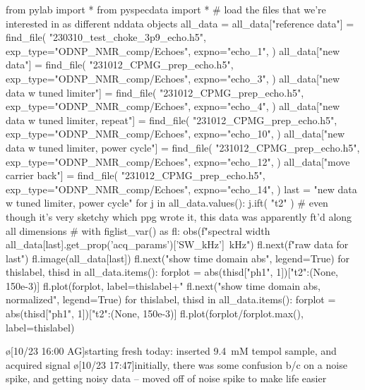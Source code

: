 \begin{python}[on]
from pylab import *
from pyspecdata import *
# {{{ load the files that we're interested in as different nddata objects
all_data = {}
all_data["reference data"] = find_file(
    "230310_test_choke_3p9_echo.h5",
    exp_type="ODNP_NMR_comp/Echoes",
    expno="echo_1",
)
all_data["new data"] = find_file(
    "231012_CPMG_prep_echo.h5",
    exp_type="ODNP_NMR_comp/Echoes",
    expno="echo_3",
)
all_data["new data w tuned limiter"] = find_file(
    "231012_CPMG_prep_echo.h5",
    exp_type="ODNP_NMR_comp/Echoes",
    expno="echo_4",
)
all_data["new data w tuned limiter, repeat"] = find_file(
    "231012_CPMG_prep_echo.h5",
    exp_type="ODNP_NMR_comp/Echoes",
    expno="echo_10",
)
all_data["new data w tuned limiter, power cycle"] = find_file(
    "231012_CPMG_prep_echo.h5",
    exp_type="ODNP_NMR_comp/Echoes",
    expno="echo_12",
)
all_data["move carrier back"] = find_file(
    "231012_CPMG_prep_echo.h5",
    exp_type="ODNP_NMR_comp/Echoes",
    expno="echo_14",
)
last = "new data w tuned limiter, power cycle"
for j in all_data.values():
    j.ift(
        "t2"
    )  # even though it's very sketchy which ppg wrote it, this data was apparently ft'd along all dimensions
# }}}
with figlist_var() as fl:
    obs(f"spectral width {all_data[last].get_prop('acq_params')['SW_kHz']}~kHz")
    fl.next(f"raw data for {last}")
    fl.image(all_data[last])
    fl.next("show time domain abs", legend=True)
    for thislabel, thisd in all_data.items():
        forplot = abs(thisd["ph1", 1])["t2":(None, 150e-3)]
        fl.plot(forplot,
            label=thislabel+"\n%
    fl.next("show time domain abs, normalized", legend=True)
    for thislabel, thisd in all_data.items():
        forplot = abs(thisd["ph1", 1])["t2":(None, 150e-3)]
        fl.plot(forplot/forplot.max(),
            label=thislabel)
\end{python}
\par
\o[10/23 16:00 AG]{starting fresh today: inserted 9.4~mM tempol sample, and acquired signal}
\o[10/23 17:47]{initially, there was some confusion b/c on a noise spike, and getting noisy data -- moved off of noise spike to make life easier}

